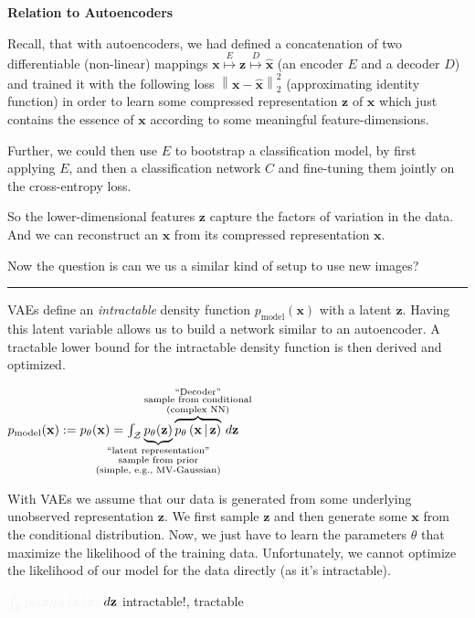 \documentclass[a2paper,4pt]{extarticle}
\makeatletter
\newcommand{\tcr}[1]{\textcolor{lighttext}{#1}}
\newcommand{\tcg}[1]{\textcolor{lighttext}{#1}}
\newcommand{\tcr}[1]{\textcolor{red}{#1}}
\newcommand{\tcg}[1]{\textcolor{green}{#1}}
\def\mc#1#{\@mc{#1}}
\def\@mc#1#2#3{%
  \protect\leavevmode
  \begingroup
    \color#1{#2}#3%
  \endgroup
}
\newcommand{\mcr}[1]{\mc{lighttext}{#1}}
\newcommand{\mcg}[1]{\mc{lighttext}{#1}}
\newcommand{\mcr}[1]{\mc{red}{#1}}
\newcommand{\mcg}[1]{\mc{green}{#1}}
\newcommand{\cZ}{\mathcal{Z}}
\newcommand{\norm}[1]{\left\lVert #1 \right\rVert}
\newcommand{\cDist}[3]{#1\left( #2 \,\middle|\, #3 \right)}
\renewcommand{\vec}[1]{\mathbf{#1}}
\newcommand{\vx}{\vec{x}}
\newcommand{\vz}{\vec{z}}
\newcommand{\vhx}{\widehat{\vec{x}}}
\newcommand{\sep}{\vspace{0pt}\noindent\hrule\vspace{0pt}}
\newcommand{\sep}{\vspace{5pt}\noindent\hrule\vspace{5pt}}
\makeatother
\begin{document}
\begin{landscape}
\begin{multicols*}{7}
\textbf{Relation to Autoencoders}

Recall, that with autoencoders, we had defined a concatenation of two
differentiable (non-linear) mappings
$\vx\stackrel{E}{\mapsto}\vz\stackrel{D}{\mapsto}\vhx$ (an encoder $E$ and a
decoder $D$) and trained it with the following loss $\norm{\vx-\vhx}_2^2$
(approximating identity function) in order to learn some compressed
representation $\vz$ of $\vx$ which just contains the essence of $\vx$ according
to some meaningful feature-dimensions.

Further, we could then use $E$ to bootstrap a classification model, by first
applying $E$, and then a classification network $C$ and fine-tuning them jointly
on the cross-entropy loss.

So the lower-dimensional features $\vz$ capture the factors of variation in
the data. And we can reconstruct an $\vx$ from its compressed representation
$\vx$.

Now the question is can we us a similar kind of setup to use new images?

\sep

VAEs define an \emph{intractable} density function $p_{\text{model}}(\vx)$ with
a latent $\vz$. Having this latent variable allows us to build a network
similar to an autoencoder. A tractable lower bound for the intractable density
function is then derived and optimized.

$
p_{\text{model}}(\vx):=
p_\theta(\vx)=\int_{\cZ}
\underbrace{p_\theta(\vz)}_{\mathclap{\substack{
\text{``latent representation''}\\
\text{sample from prior}\\
\text{(simple, e.g., MV-Gaussian)}}}}
\overbrace{\cDist{p_\theta}{\vx}{\vz}}^{\mathclap{\substack{
\text{``Decoder''}\\
\text{sample from conditional}\\
\text{(complex NN)}}}} \,d\vz 
$

With VAEs we assume that our data is generated from some underlying unobserved
representation $\vz$. We first sample $\vz$ and then generate some $\vx$ from
the conditional distribution. Now, we just have to learn the parameters $\theta$
that maximize the likelihood of the training data. Unfortunately, we cannot
optimize the likelihood of our model for the data directly (as it's
intractable). 

$\mcr{\int_{\cZ}} \mcg{p_\theta(\vz)}\mcg{\cDist{p_\theta}{\vx}{\vz}} \,d\vz$
\quad\tcr{intractable!}, \tcg{tractable}


\end{multicols*}
\end{landscape}
\end{document}
